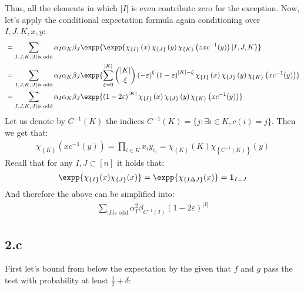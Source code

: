 \documentclass{article}
\newcommand{\Chi}[1]{\chi_{ \left\{ #1  \right\} } }
\begin{document}
Thus, all the elements in which $|I|$ is even contribute zero for the exception. Now, let's apply the conditional expectation formula again conditioning over $I,J,K, x,y$:   
\begin{equation*}
  \begin{split}
    &  = \sum_{I,J,K, |I| \text{is odd} }\alpha_{I}\alpha_{K}\beta_{J} \expp{\expp{ \Chi{I}\left(  x \right)\Chi{J}\left( y \right) \Chi{K}\left( zx c^{-1}(y) \right) | I,J,K }} \\  
    &  = \sum_{I,J,K, |I| \text{is odd} }\alpha_{I}\alpha_{K}\beta_{J} \expp{ \sum_{ \xi = 0}^{|K|}{ { |K| \choose \xi } \left( -\varepsilon \right)^{\xi} \left( 1 - \varepsilon \right)^{|K|- \xi} \Chi{I}\left(  x \right)\Chi{J}\left( y \right) \Chi{K}\left( x c^{-1}(y) \right) }} \\  
    &  = \sum_{I,J,K, |I| \text{is odd} }\alpha_{I}\alpha_{K}\beta_{J} \expp{ \left( 1 -2 \varepsilon \right)^{|K|} \Chi{I}\left(  x \right)\Chi{J}\left( y \right) \Chi{K}\left( x c^{-1}(y) \right) }   
  \end{split}
\end{equation*}
Let us denote by $C^{-1}(K)$ the indices $C^{-1}(K) = \{ j : \exists i \in K, c(i) = j \}$. Then we get that:  
\begin{equation*}
  \begin{split}
    \Chi{K}\left( x c^{-1}(y) \right) = \prod_{i \in K}{x_{i}y_{c_{i}}} =  \Chi{K}\left( K \right) \Chi{C^{-1}(K)}\left( y  \right)
  \end{split}
\end{equation*} Recall that for any $I,J \subset [n]$ it holds that: 
\begin{equation*}
  \begin{split}
    \expp{ \Chi{I}(x)\Chi{J}(x) } = \expp{ \Chi{I \Delta J}(x) } = \mathbf{1}_{ I = J }
  \end{split}
\end{equation*}
And therefore the above can be simplified into: 
\begin{equation*}
  \begin{split}
    \sum_{|I| \text{is odd} }{\alpha_{I}^{2}\beta_{C^{-1}(I)}  \left( 1 -2 \varepsilon \right)^{|I|}}   
  \end{split}
\end{equation*}

\subsection{2.c} 
First let's bound from below the expectation by the given that $f$ and $g$ pass the test with probability at least $\frac{1}{2} + \delta$:
\end{document}
